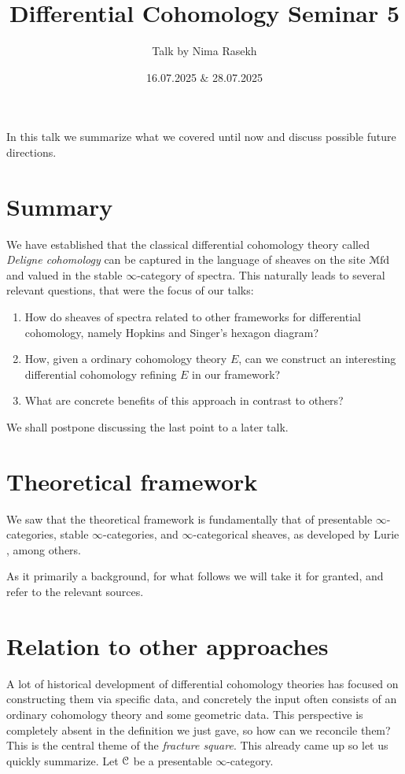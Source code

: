\documentclass[10pt]{amsart}
\title{Differential Cohomology Seminar 5}
\date{16.07.2025 $\&$ 28.07.2025}
\author{Talk by Nima Rasekh}
\begin{document}
\maketitle

In this talk we summarize what we covered until now and discuss possible future directions.

\section {Summary}

We have established that the classical differential cohomology theory called \emph{Deligne cohomology} can be captured in the language of sheaves on the site $\mathcal{M}\mathrm{fd}$ and valued in the stable $\infty$-category of spectra. This naturally leads to several relevant questions, that were the focus of our talks:
\begin{enumerate}
  \item How do sheaves of spectra related to other frameworks for differential cohomology, namely Hopkins and Singer's hexagon diagram?
  \item How, given a ordinary cohomology theory $E$, can we construct an interesting differential cohomology refining $E$ in our framework?
  \item What are concrete benefits of this approach in contrast to others? 
\end{enumerate} We shall postpone discussing the last point to a later talk. 

\section{Theoretical framework}

We saw that the theoretical framework is fundamentally that of presentable $\infty$-categories, stable $\infty$-categories, and $\infty$-categorical sheaves, as developed by Lurie \cite{lurie2009htt}, among others. 

As it primarily a background, for what follows we will take it for granted, and refer to the relevant sources.

\section{Relation to other approaches}
A lot of historical development of differential cohomology theories has focused on constructing them via specific data, and concretely the input often consists of an ordinary cohomology theory and some geometric data. This perspective is completely absent in the definition we just gave, so how can we reconcile them? This is the central theme of the \emph{fracture square}. This already came up so let us quickly summarize. Let $\mathcal{C}$ be a presentable $\infty$-category. 
\end{document}
